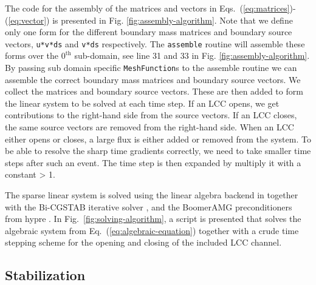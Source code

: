 The \pydolfin code for the assembly of the matrices and vectors in Eqs.~(\ref{eq:matrices})-(\ref{eq:vector}) is presented in Fig. \ref{fig:assembly-algorithm}. Note that we define only one form for the different boundary mass matrices and boundary source vectors, \texttt{u*v*ds} and \texttt{v*ds} respectively. The \texttt{assemble} routine will assemble these forms over the $0^{\scriptscriptstyle\text{th}}$ sub-domain, see line 31 and 33 in Fig. \ref{fig:assembly-algorithm}. By passing sub domain specific \texttt{MeshFunction}s to the assemble routine we can assemble the correct boundary mass matrices and boundary source vectors. We collect the matrices and boundary source vectors. These are then added to form the linear system to be solved at each time step. If an LCC opens, we get contributions to the right-hand side from the source vectors. If an LCC closes, the same source vectors are removed from the right-hand side. When an LCC either opens or closes, a large flux is either added or removed from the system. To be able to resolve the sharp time gradients correctly, we need to take smaller time steps after such an event. The time step is then expanded by multiply it with a constant > 1.\par

The sparse linear system is solved using the \petsc linear algebra backend \cite{BalayBuschelmanEtAl2001} in \pydolfin together with the Bi-CGSTAB iterative solver \cite{Vorst1992}, and the BoomerAMG preconditioners from hypre \cite{FalgoutYang2002}. In Fig.~\ref{fig:solving-algorithm}, a script is presented that solves the algebraic system from Eq.~(\ref{eq:algebraic-equation}) together with a crude time stepping scheme for the opening and closing of the included LCC channel.\par

\subsection*{Stabilization}
\label{sec:stabilization}


